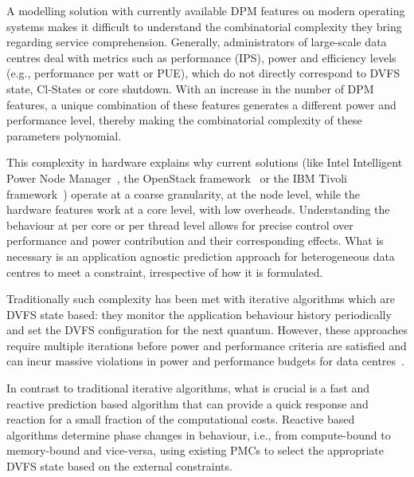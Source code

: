  A modelling solution with currently available DPM features on modern
operating systems makes it difficult to understand the combinatorial complexity they bring
regarding service comprehension.  Generally, administrators of large-scale data centres
deal with metrics such as performance (IPS), power and efficiency levels (e.g.,
performance per watt or PUE), which do not directly correspond to DVFS state, Cl-States or
core shutdown. With an increase in the number of DPM features, a unique combination of
these features generates a different power and performance level, thereby making the
combinatorial complexity of these parameters polynomial.


 This complexity in hardware explains why current solutions (like Intel
Intelligent Power Node Manager~\citep{IntelNode}, the OpenStack
framework~\citep{Openstack} or the IBM Tivoli framework~\citep{IBMTivoli}) operate at a
coarse granularity, at the node level, while the hardware features work at a core level,
with low overheads.  Understanding the behaviour at per core or per thread level allows
for precise control over performance and power contribution and their corresponding
effects.  What is necessary is an application agnostic prediction approach for
heterogeneous data centres to meet a constraint, irrespective of how it is formulated. 


Traditionally such complexity has been met with iterative algorithms which are DVFS state
based: they monitor the application behaviour history
periodically~\citep{Blagodurov:2010:CSM:1880018.1880019} and set the DVFS configuration
for the next quantum. However, these approaches require multiple iterations before power
and performance criteria are satisfied and can incur massive violations in power and
performance budgets for data centres~\citep{Mars2011HeterogeneityOpportunity,
Singh:2009:RTP:1577129.1577137}.   


In contrast to traditional iterative algorithms, what is crucial is a fast and reactive
prediction based algorithm that can provide a quick response and reaction for a small
fraction of the computational costs. Reactive based algorithms determine phase changes in
behaviour, i.e., from compute-bound to memory-bound and vice-versa, using existing PMCs to
select the appropriate DVFS state based on the external constraints.   



